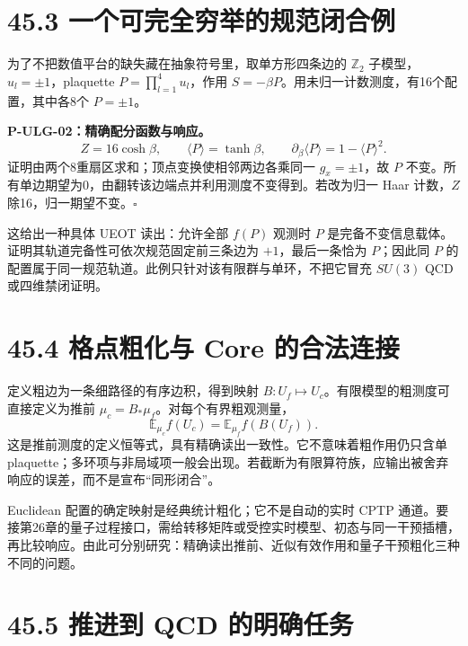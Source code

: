 \documentclass[
  11pt,
  oneside]{book}
\begin{document}
\hypertarget{ux4e00ux4e2aux53efux5b8cux5168ux7a77ux4e3eux7684ux89c4ux8303ux95edux5408ux4f8b}{%
\section{45.3
一个可完全穷举的规范闭合例}\label{ux4e00ux4e2aux53efux5b8cux5168ux7a77ux4e3eux7684ux89c4ux8303ux95edux5408ux4f8b}}

为了不把数值平台的缺失藏在抽象符号里，取单方形四条边的 \(\mathbb Z_2\)
子模型，\(u_l=\pm1\)，plaquette \(P=\prod_{l=1}^4u_l\)，作用
\(S=-\beta P\)。用未归一计数测度，有16个配置，其中各8个 \(P=\pm1\)。

\protect\hypertarget{p-ulg-02}{}{}

\textbf{P-ULG-02：精确配分函数与响应。} \[
Z=16\cosh\beta,\qquad \langle P\rangle=\tanh\beta,
\qquad\partial_\beta\langle P\rangle=1-\langle P\rangle^2.
\] 证明由两个8重扇区求和；顶点变换使相邻两边各乘同一 \(g_x=\pm1\)，故
\(P\)
不变。所有单边期望为0，由翻转该边端点并利用测度不变得到。若改为归一 Haar
计数，\(Z\) 除16，归一期望不变。\(\square\)

这给出一种具体 UEOT 读出：允许全部 \(f(P)\) 观测时 \(P\)
是完备不变信息载体。证明其轨道完备性可依次规范固定前三条边为
\(+1\)，最后一条恰为 \(P\)；因此同 \(P\)
的配置属于同一规范轨道。此例只针对该有限群与单环，不把它冒充 \(SU(3)\)
QCD 或四维禁闭证明。

\hypertarget{ux683cux70b9ux7c97ux5316ux4e0e-core-ux7684ux5408ux6cd5ux8fdeux63a5}{%
\section{45.4 格点粗化与 Core
的合法连接}\label{ux683cux70b9ux7c97ux5316ux4e0e-core-ux7684ux5408ux6cd5ux8fdeux63a5}}

定义粗边为一条细路径的有序边积，得到映射
\(B:U_f\mapsto U_c\)。有限模型的粗测度可直接定义为推前
\(\mu_c=B_*\mu_f\)。对每个有界粗观测量， \[
\mathbb E_{\mu_c}f(U_c)=\mathbb E_{\mu_f}f(B(U_f)).
\]
这是推前测度的定义恒等式，具有精确读出一致性。它不意味着粗作用仍只含单
plaquette；多环项与非局域项一般会出现。若截断为有限算符族，应输出被舍弃响应的误差，而不是宣布``同形闭合''。

Euclidean 配置的确定映射是经典统计粗化；它不是自动的实时 CPTP
通道。要接第26章的量子过程接口，需给转移矩阵或受控实时模型、初态与同一干预插槽，再比较响应。由此可分别研究：精确读出推前、近似有效作用和量子干预粗化三种不同的问题。

\hypertarget{ux63a8ux8fdbux5230-qcd-ux7684ux660eux786eux4efbux52a1}{%
\section{45.5 推进到 QCD
的明确任务}\label{ux63a8ux8fdbux5230-qcd-ux7684ux660eux786eux4efbux52a1}}
\end{document}
